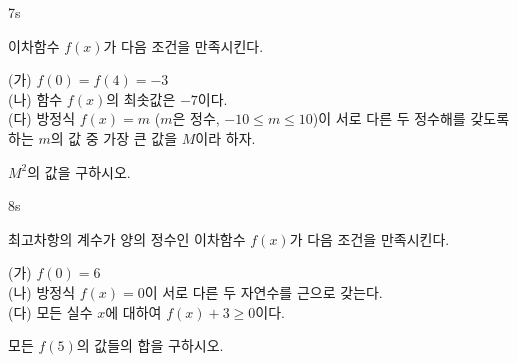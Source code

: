 \documentclass[10pt]{article}
\begin{document}
\begin{pagepair}

\begin{problem}{7}{s}
\par\smallskip
이차함수 $f(x)$가 다음 조건을 만족시킨다.
\begin{conditions}
\setlength{\baselineskip}{1.4\baselineskip}
(가) $f(0) = f(4) = -3$ \\[4pt]
(나) 함수 $f(x)$의 최솟값은 $-7$이다. \\[4pt]
(다) 방정식 $f(x) = m$ ($m$은 정수, $-10 \le m \le 10$)이 서로 다른 두 정수해를 갖도록 하는 $m$의 값 중 가장 큰 값을 $M$이라 하자.
\end{conditions}
$M^2$의 값을 구하시오.
\end{problem}

\begin{problem}{8}{s}
\par\smallskip
최고차항의 계수가 양의 정수인 이차함수 $f(x)$가 다음 조건을 만족시킨다.
\begin{conditions}
\setlength{\baselineskip}{1.4\baselineskip}
(가) $f(0) = 6$ \\[4pt]
(나) 방정식 $f(x) = 0$이 서로 다른 두 자연수를 근으로 갖는다. \\[4pt]
(다) 모든 실수 $x$에 대하여 $f(x) + 3 \ge 0$이다.
\end{conditions}
모든 $f(5)$의 값들의 합을 구하시오.
\end{problem}

\end{pagepair}
\end{document}
